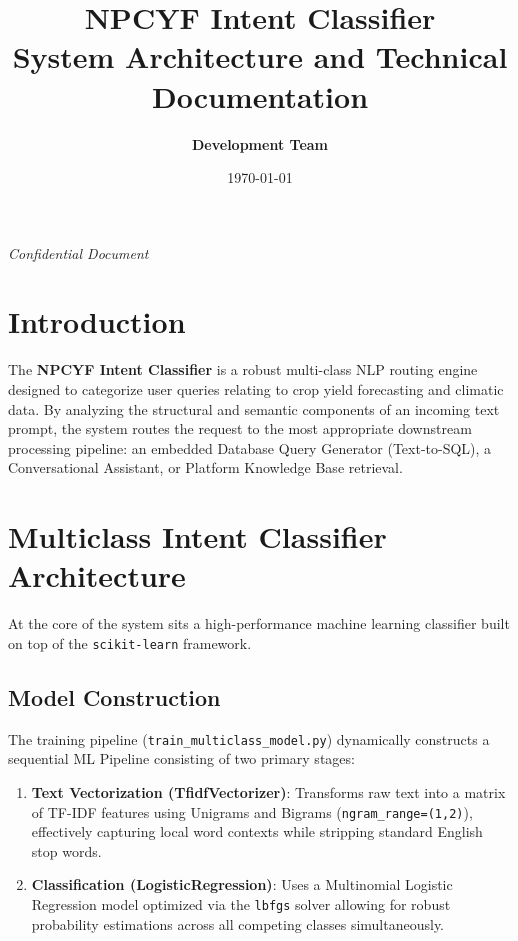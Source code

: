 \documentclass[12pt,a4paper]{article}
\title{\textbf{\Huge NPCYF Intent Classifier} \\[0.5em] \Large System Architecture and Technical Documentation}
\author{\textbf{Development Team}}
\date{\today}
\begin{document}
\maketitle
\thispagestyle{empty}
\vspace*{\fill}
\begin{center}
    \textit{Confidential Document}
\end{center}
\vspace*{\fill}
\newpage

\tableofcontents
\newpage

\section{Introduction}
The \textbf{NPCYF Intent Classifier} is a robust multi-class NLP routing engine designed to categorize user queries relating to crop yield forecasting and climatic data. By analyzing the structural and semantic components of an incoming text prompt, the system routes the request to the most appropriate downstream processing pipeline: an embedded Database Query Generator (Text-to-SQL), a Conversational Assistant, or Platform Knowledge Base retrieval.

\section{Multiclass Intent Classifier Architecture}
At the core of the system sits a high-performance machine learning classifier built on top of the \texttt{scikit-learn} framework. 

\subsection{Model Construction}
The training pipeline (\texttt{train\_multiclass\_model.py}) dynamically constructs a sequential ML Pipeline consisting of two primary stages:
\begin{enumerate}
    \item \textbf{Text Vectorization (TfidfVectorizer)}: Transforms raw text into a matrix of TF-IDF features using Unigrams and Bigrams (\texttt{ngram\_range=(1,2)}), effectively capturing local word contexts while stripping standard English stop words.
    \item \textbf{Classification (LogisticRegression)}: Uses a Multinomial Logistic Regression model optimized via the \texttt{lbfgs} solver allowing for robust probability estimations across all competing classes simultaneously.
\end{enumerate}
\end{document}
